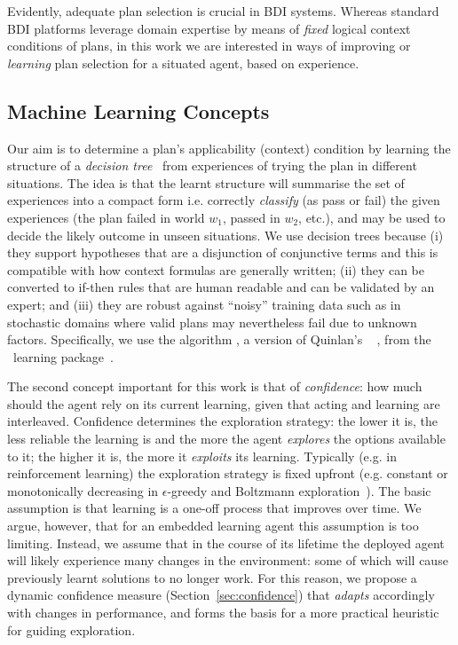 Evidently, adequate plan selection is crucial in BDI systems. Whereas standard BDI platforms leverage domain expertise by means of \emph{fixed} logical context conditions of plans, in this work we are interested in ways of improving or \emph{learning} plan selection for a situated agent, based on experience.

\subsection{Machine Learning Concepts}

Our aim is to determine a plan's applicability (context) condition by learning the structure of a {\em decision tree}~\cite{Mitchell97:ML} from experiences of trying the plan in different situations. The idea is that the learnt structure will summarise the set of experiences into a compact form i.e. correctly {\em classify} (as pass or fail) the given experiences (the plan failed in world $w_1$, passed in $w_2$, etc.), and may be used to decide the likely outcome in unseen situations.
%
We use decision trees because (i) they support hypotheses that are a disjunction of conjunctive terms and this is compatible with how context formulas are generally written; (ii) they can be converted to if-then rules that are human readable and can be validated by an expert; and (iii) they are robust against ``noisy'' training data such as in stochastic domains where valid plans may nevertheless fail due to unknown factors. 
%
Specifically, we use the algorithm , a version of Quinlan's ~\cite{quinlan93:c4.-5:-programs} , from the \weka\ learning package~\cite{weka99}.

The second concept important for this work is that of {\em confidence}: how much should the agent rely on its current learning, given that acting and learning are interleaved. Confidence determines the exploration strategy: the lower it is, the less reliable the learning is and the more the agent {\em explores} the options available to it; the higher it is, the more it {\em exploits} its learning. Typically (e.g. in reinforcement learning) the exploration strategy is fixed upfront (e.g. constant or monotonically decreasing in $\epsilon$-greedy and Boltzmann exploration~\cite{sutton98:reinforcement}). The basic assumption is that learning is a one-off process that improves over time. We argue, however, that for an embedded learning agent this assumption is too limiting. Instead, we assume that in the course of its lifetime the deployed agent will likely experience many changes in the environment: some of which will cause previously learnt solutions to no longer work. For this reason, we propose a dynamic confidence measure (Section~\ref{sec:confidence}) that {\em adapts} accordingly with changes in performance, and forms the basis for a more practical heuristic for guiding exploration.
